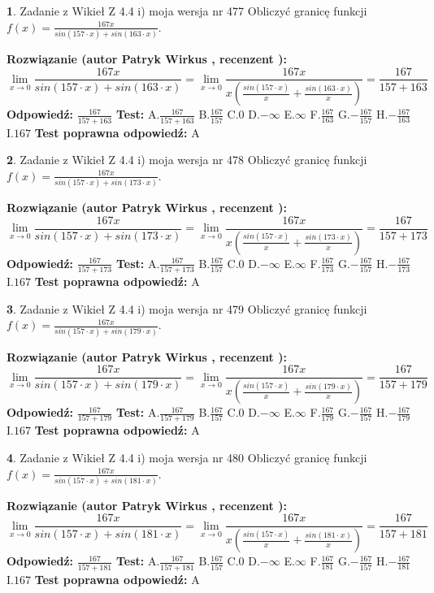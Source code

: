 \documentclass[12pt, a4paper]{article}
\theoremstyle{definition} %
\newtheorem{zad}{}
\newcommand{\zadStart}[1]{\begin{zad}#1\newline}
\newcommand{\zadStop}{\end{zad}}
\newcommand{\rozwStart}[2]{\noindent \textbf{Rozwiązanie (autor #1 , recenzent #2): }\newline}
\newcommand{\rozwStop}{\newline}
\newcommand{\odpStart}{\noindent \textbf{Odpowiedź:}\newline}
\newcommand{\odpStop}{\newline}
\newcommand{\testStart}{\noindent \textbf{Test:}\newline}
\newcommand{\testStop}{\newline}
\newcommand{\kluczStart}{\noindent \textbf{Test poprawna odpowiedź:}\newline}
\newcommand{\kluczStop}{\newline}
\begin{document}
\zadStart{Zadanie z Wikieł Z 4.4 i) moja wersja nr 477}
Obliczyć granicę funkcji $f(x)=\frac{167x}{sin(157\cdot x) +sin(163\cdot x)}$.
\zadStop
\rozwStart{Patryk Wirkus}{}
$$\lim\limits_{x\to 0}\frac{167x}{sin(157\cdot x) +sin(163\cdot x)}=\lim\limits_{x\to 0}\frac{167x}{x(\frac{sin(157\cdot x)}{x}+\frac{sin(163\cdot x)}{x})}=\frac{167}{157+163}$$
\rozwStop
\odpStart
$\frac{167}{157+163}$
\odpStop
\testStart
A.$\frac{167}{157+163}$
B.$\frac{167}{157}$
C.$0$
D.$-\infty$
E.$\infty$
F.$\frac{167}{163}$
G.$-\frac{167}{157}$
H.$-\frac{167}{163}$
I.$167$
\testStop
\kluczStart
A
\kluczStop



\zadStart{Zadanie z Wikieł Z 4.4 i) moja wersja nr 478}
Obliczyć granicę funkcji $f(x)=\frac{167x}{sin(157\cdot x) +sin(173\cdot x)}$.
\zadStop
\rozwStart{Patryk Wirkus}{}
$$\lim\limits_{x\to 0}\frac{167x}{sin(157\cdot x) +sin(173\cdot x)}=\lim\limits_{x\to 0}\frac{167x}{x(\frac{sin(157\cdot x)}{x}+\frac{sin(173\cdot x)}{x})}=\frac{167}{157+173}$$
\rozwStop
\odpStart
$\frac{167}{157+173}$
\odpStop
\testStart
A.$\frac{167}{157+173}$
B.$\frac{167}{157}$
C.$0$
D.$-\infty$
E.$\infty$
F.$\frac{167}{173}$
G.$-\frac{167}{157}$
H.$-\frac{167}{173}$
I.$167$
\testStop
\kluczStart
A
\kluczStop



\zadStart{Zadanie z Wikieł Z 4.4 i) moja wersja nr 479}
Obliczyć granicę funkcji $f(x)=\frac{167x}{sin(157\cdot x) +sin(179\cdot x)}$.
\zadStop
\rozwStart{Patryk Wirkus}{}
$$\lim\limits_{x\to 0}\frac{167x}{sin(157\cdot x) +sin(179\cdot x)}=\lim\limits_{x\to 0}\frac{167x}{x(\frac{sin(157\cdot x)}{x}+\frac{sin(179\cdot x)}{x})}=\frac{167}{157+179}$$
\rozwStop
\odpStart
$\frac{167}{157+179}$
\odpStop
\testStart
A.$\frac{167}{157+179}$
B.$\frac{167}{157}$
C.$0$
D.$-\infty$
E.$\infty$
F.$\frac{167}{179}$
G.$-\frac{167}{157}$
H.$-\frac{167}{179}$
I.$167$
\testStop
\kluczStart
A
\kluczStop



\zadStart{Zadanie z Wikieł Z 4.4 i) moja wersja nr 480}
Obliczyć granicę funkcji $f(x)=\frac{167x}{sin(157\cdot x) +sin(181\cdot x)}$.
\zadStop
\rozwStart{Patryk Wirkus}{}
$$\lim\limits_{x\to 0}\frac{167x}{sin(157\cdot x) +sin(181\cdot x)}=\lim\limits_{x\to 0}\frac{167x}{x(\frac{sin(157\cdot x)}{x}+\frac{sin(181\cdot x)}{x})}=\frac{167}{157+181}$$
\rozwStop
\odpStart
$\frac{167}{157+181}$
\odpStop
\testStart
A.$\frac{167}{157+181}$
B.$\frac{167}{157}$
C.$0$
D.$-\infty$
E.$\infty$
F.$\frac{167}{181}$
G.$-\frac{167}{157}$
H.$-\frac{167}{181}$
I.$167$
\testStop
\kluczStart
A
\kluczStop
\end{document}
